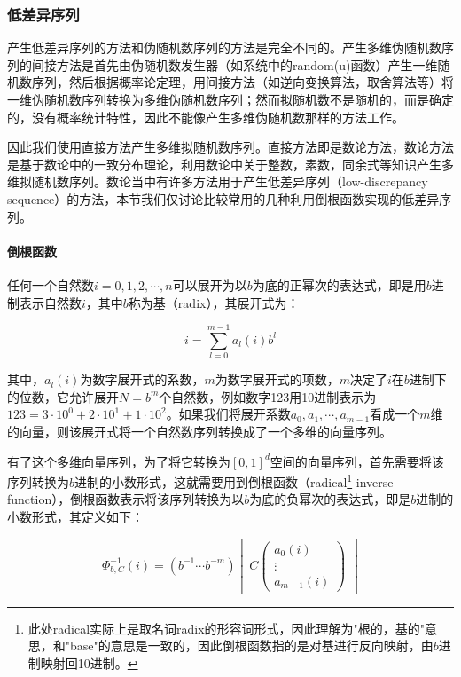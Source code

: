 \subsubsection{低差异序列}
产生低差异序列的方法和伪随机数序列的方法是完全不同的。产生多维伪随机数序列的间接方法是首先由伪随机数发生器（如系统中的random(u)函数）产生一维随机数序列，然后根据概率论定理，用间接方法（如逆向变换算法，取舍算法等）将一维伪随机数序列转换为多维伪随机数序列；然而拟随机数不是随机的，而是确定的，没有概率统计特性，因此不能像产生多维伪随机数那样的方法工作。

因此我们使用直接方法产生多维拟随机数序列。直接方法即是数论方法，数论方法是基于数论中的一致分布理论，利用数论中关于整数，素数，同余式等知识产生多维拟随机数序列。数论当中有许多方法用于产生低差异序列（low-discrepancy sequence）的方法，本节我们仅讨论比较常用的几种利用倒根函数实现的低差异序列。





\paragraph{倒根函数}
任何一个自然数$i=0,1,2,\cdots,n$可以展开为以$b$为底的正幂次的表达式，即是用$b$进制表示自然数$i$，其中$b$称为基（radix），其展开式为：

\begin{equation}
	i=\sum^{m-1}_{l=0}a_l(i)b^{l}
\end{equation}

\noindent 其中，$a_l(i)$为数字展开式的系数，$m$为数字展开式的项数，$m$决定了$i$在$b$进制下的位数，它允许展开$N=b^{m}$个自然数，例如数字123用10进制表示为$123=3\cdot 10^{0}+2\cdot 10^{1}+1\cdot 10^{2}$。如果我们将展开系数$a_0,a_1,\cdots,a_{m-1}$看成一个$m$维的向量，则该展开式将一个自然数序列转换成了一个多维的向量序列。

有了这个多维向量序列，为了将它转换为$[0,1]^d$空间的向量序列，首先需要将该序列转换为$b$进制的小数形式，这就需要用到倒根函数（radical\footnote{此处radical实际上是取名词radix的形容词形式，因此理解为"根的，基的"意思，和"base"的意思是一致的，因此倒根函数指的是对基进行反向映射，由$b$进制映射回10进制。} inverse function），倒根函数表示将该序列转换为以$b$为底的负幂次的表达式，即是$b$进制的小数形式，其定义如下：

\begin{equation}
	\Phi^{-1}_{b,C}(i)=(b^{-1}\cdots b^{-m})\begin{bmatrix}
	 C \begin{pmatrix}
		a_0(i)\\
		\vdots\\
		a_{m-1}(i)
	\end{pmatrix} \end{bmatrix}
\end{equation}

